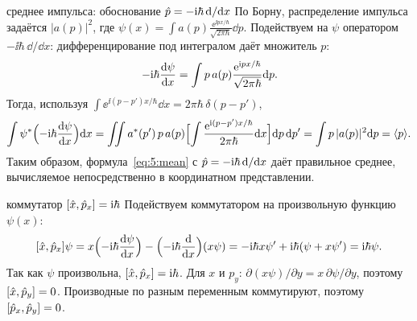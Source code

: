 \begin{derivation}[label=der:5:pmean]{среднее импульса: обоснование $\hat{p}=-\mathrm{i}\hbar\,\mathrm{d}/\mathrm{d} x$}
По Борну, распределение импульса задаётся $|a(p)|^2$, где $\psi(x)=\int a(p)\frac{\ee^{\ii px/\hbar}}{\sqrt{2\pi\hbar}}\dd p$.
Подействуем на $\psi$ оператором $-\ii\hbar\,\dd/\dd x$: дифференцирование под интегралом даёт
множитель $p$:
\[
  -\mathrm{i}\hbar\frac{\mathrm{d} \psi}{\mathrm{d} x}=\int p\,a(p)\frac{\mathrm{e}^{\mathrm{i} px/\hbar}}{\sqrt{2\pi\hbar}}\mathrm{d} p .
\]
Тогда, используя $\int\ee^{\ii(p-p')x/\hbar}\dd x=2\pi\hbar\,\delta(p-p')$,
\[
  \int\psi^*\Bigl(-\mathrm{i}\hbar\frac{\mathrm{d} \psi}{\mathrm{d} x}\Bigr)\mathrm{d} x
  =\iint a^*(p')\,p\,a(p)\Bigl[\int\frac{\mathrm{e}^{\mathrm{i}(p-p')x/\hbar}}{2\pi\hbar}\mathrm{d} x\Bigr]\mathrm{d} p\,\mathrm{d} p'
  =\int p\,|a(p)|^2\mathrm{d} p=\langle p\rangle .
\]
Таким образом, формула~\eqref{eq:5:mean} с $\hat{p}=-\mathrm{i}\hbar\,\mathrm{d}/\mathrm{d} x$ даёт правильное среднее,
вычисляемое непосредственно в координатном представлении.
\end{derivation}

\begin{derivation}[label=der:5:comm]{коммутатор $[\hat{x},\hat{p}_x]=\mathrm{i}\hbar$}
Подействуем коммутатором на произвольную функцию $\psi(x)$:
\[
  [\hat{x},\hat{p}_x]\psi=x\Bigl(-\mathrm{i}\hbar\frac{\mathrm{d} \psi}{\mathrm{d} x}\Bigr)-\Bigl(-\mathrm{i}\hbar\frac{\mathrm{d} }{\mathrm{d} x}\Bigr)(x\psi)
  =-\mathrm{i}\hbar x\psi'+\mathrm{i}\hbar(\psi+x\psi')=\mathrm{i}\hbar\psi .
\]
Так как $\psi$ произвольна, $[\hat{x},\hat{p}_x]=\mathrm{i}\hbar$. Для $x$ и $p_y$: $\partial(x\psi)/\partial y=x\,\partial\psi/\partial y$,
поэтому $[\hat{x},\hat{p}_y]=0$. Производные по разным переменным коммутируют, поэтому $[\hat{p}_x,\hat{p}_y]=0$.
\end{derivation}

